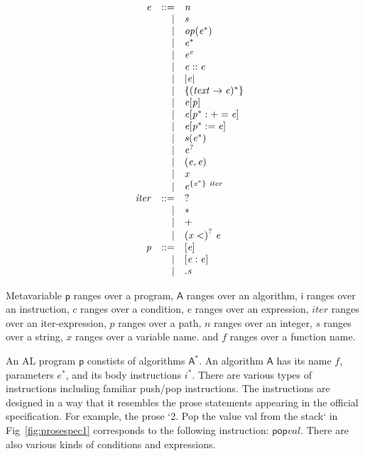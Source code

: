 \begin{minipage}{0.5\textwidth}
$$
\begin{array}{@{}lrrl@{}}
& \mathit{e} &::=& \mathit{n} \\ &&|&
\mathit{s} \\ &&|&
\mathit{op}(\mathit{e^\ast}) \\ &&|&
\mathit{e}^\ast \\ &&|&
\mathit{e}^\mathit{e} \\ &&|&
\mathit{e}::\mathit{e} \\ &&|&
|\mathit{e}| \\ &&|&
\{{(\mathit{text} \rightarrow \mathit{e})^\ast}\} \\ &&|&
\mathit{e}[\mathit{p}] \\ &&|&
\mathit{e}[\mathit{p}^\ast:+=\mathit{e}] \\ &&|&
\mathit{e}[\mathit{p}^\ast:=\mathit{e}] \\ &&|&
\mathit{s}(\mathit{e}^\ast) \\ &&|&
\mathit{e}^? \\ &&|&
(\mathit{e},\mathit{e}) \\ &&|&
\mathit{x} \\ &&|&
\mathit{e}^{\{\mathit{x}^\ast\}~\mathit{iter}} \\
& \mathit{iter} &::=& \mathsf{?} \\ &&|&
\mathsf{\ast} \\ &&|&
\mathsf{+} \\ &&|&
{(\mathit{x}<)}^?~\mathit{e} \\
& \mathit{p} &::=& [\mathit{e}] \\ &&|&
[\mathit{e}:\mathit{e}] \\ &&|&
.\mathit{s} \\
\end{array}
$$
\end{minipage}

Metavariable
$\mathsf{p}$ ranges over a program,
$\mathsf{A}$ ranges over an algorithm,
$\mathsf{i}$ ranges over an instruction,
$\mathit{c}$ ranges over a condition,
$\mathit{e}$ ranges over an expression,
$\mathit{iter}$ ranges over an iter-expression,
$\mathit{p}$ ranges over a path,
$\mathit{n}$ ranges over an integer,
$\mathit{s}$ ranges over a string,
$\mathit{x}$ ranges over a variable name.
and
$\mathit{f}$ ranges over a function name.

An AL program $\mathsf{p}$ constists of algorithms $\mathsf{A}^\ast$.  An
algorithm $\mathsf{A}$ has its name $\mathit{f}$, parameters
${\mathit{e}^\ast}$, and its body instructions ${\mathit{i}^\ast}$.  There are
various types of instructions including familiar push/pop instructions. The
instructions are designed in a way that it resembles the prose statements
appearing in the official specification.  For example, the prose `2. Pop the
value val from the stack` in Fig~\ref{fig:prosespec1} corresponds to the following
instruction: $\mathsf{pop} \mathit{val}$. There are also various kinds of
conditions and expressions.
